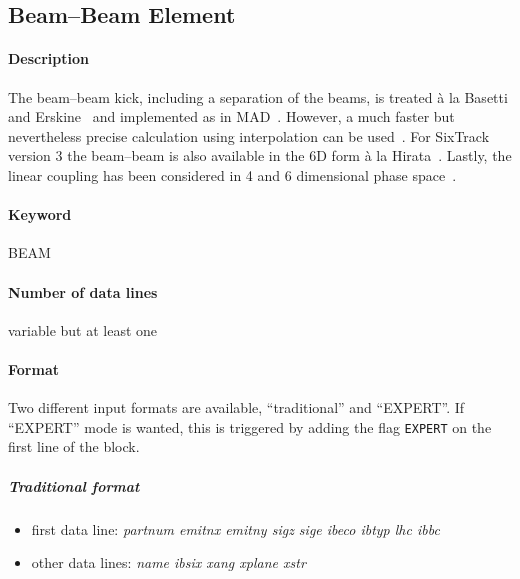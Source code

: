 \subsection{Beam--Beam Element}
\label{BeamBeam}

\paragraph{Description} The beam--beam kick, including a separation of the beams, is treated \`{a} la Basetti and Erskine~\cite{BasErs} and implemented as in MAD~\cite{MAD}.
However, a much faster but nevertheless precise calculation using interpolation can be used~\cite{ERIC}.
For SixTrack version 3 the beam--beam is also available in the 6D form \`{a} la Hirata~\cite{Hirata}.
Lastly, the linear coupling has been considered in 4 and 6 dimensional phase space~\cite{ripbeam}. 

\paragraph{Keyword} BEAM
\paragraph{Number of data lines} variable but at least one

\paragraph{Format}
Two different input formats are available, ``traditional'' and ``EXPERT''.
If ``EXPERT'' mode is wanted, this is triggered by adding the flag \texttt{EXPERT} on the first line of the block.

\subparagraph{Traditional format}

\begin{itemize}
\item first data line: {\em partnum emitnx emitny sigz sige ibeco
    ibtyp lhc ibbc} 
\item other data lines: {\em name ibsix xang xplane xstr}
\end{itemize}

